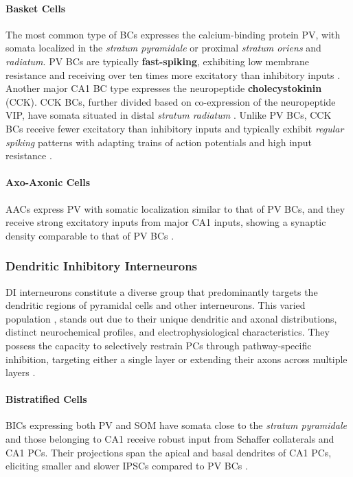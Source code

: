 \documentclass[../main.tex]{subfiles}
\begin{document}
\paragraph{Basket Cells}
The most common type of BCs expresses the calcium-binding protein PV, with somata localized in the \textit{stratum pyramidale} or proximal \textit{stratum oriens} and \textit{radiatum}.
PV BCs are typically \textbf{fast-spiking}, exhibiting low membrane resistance and receiving over ten times more excitatory than inhibitory inputs \citep{halasy1996synaptic}.
Another major CA1 BC type expresses the neuropeptide \textbf{cholecystokinin} (CCK). 
CCK BCs, further divided based on co-expression of the neuropeptide VIP, have somata situated in distal \textit{stratum radiatum} \citep{acsady1996different,acsady1996correlated}. 
Unlike PV BCs, CCK BCs receive fewer excitatory than inhibitory inputs and typically exhibit \textit{regular spiking} patterns with adapting trains of action potentials and high input resistance \citep{booker_morphological_2018}.

\paragraph{Axo-Axonic Cells}
AACs express PV with somatic localization similar to that of PV BCs, and they receive strong excitatory inputs from major CA1 inputs, showing a synaptic density comparable to that of PV BCs \citep{buhl1994physiological,papp2013different}.

\subsubsection{Dendritic Inhibitory Interneurons}
DI interneurons constitute a diverse group that predominantly targets the dendritic regions of pyramidal cells and other interneurons.
This varied population \cite{klausberger_gabaergic_2009}, stands out due to their unique dendritic and axonal distributions, distinct neurochemical profiles, and electrophysiological characteristics.
They possess the capacity to selectively restrain PCs through pathway-specific inhibition, targeting either a single layer or extending their axons across multiple layers \citep{melzer2012long}.

\paragraph{Bistratified Cells}
BICs expressing both PV and SOM have somata close to the \textit{stratum pyramidale} and those belonging to CA1 receive robust input from Schaffer collaterals and CA1 PCs.
Their projections span the apical and basal dendrites of CA1 PCs, eliciting smaller and slower IPSCs compared to PV BCs \citep{booker_morphological_2018}.
\end{document}
